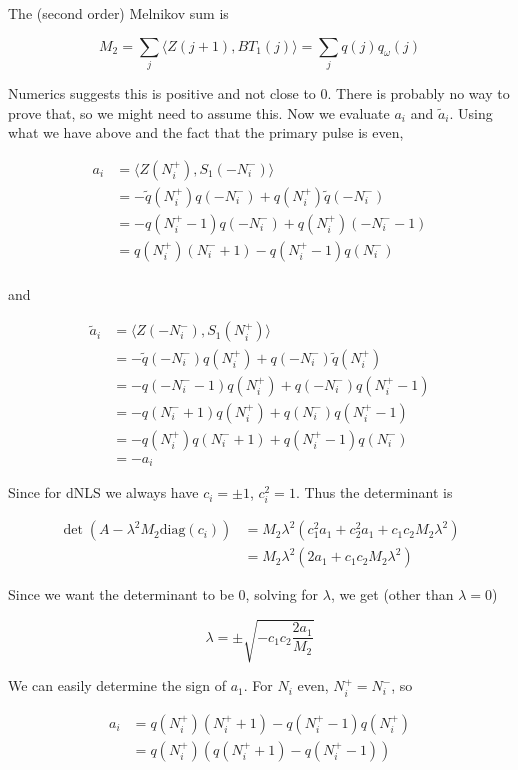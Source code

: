 \documentclass[12pt]{article}
\begin{document}
The (second order) Melnikov sum is

\[
M_2 = \sum_j \langle Z(j+1), B T_1(j) \rangle = \sum_j q(j) q_\omega(j)
\]

Numerics suggests this is positive and not close to 0. There is probably no way to prove that, so we might need to assume this. Now we evaluate $a_i$ and $\tilde{a}_i$. Using what we have above and the fact that the primary pulse is even,

\begin{align*}
a_i &= \langle Z(N_i^+), S_1(-N_i^-) \rangle \\
&= -\tilde{q}(N_i^+)q(-N_i^-) + q(N_i^+)\tilde{q}(-N_i^-) \\
&= -q(N_i^+ - 1)q(-N_i^-) + q(N_i^+)(-N_i^- - 1) \\
&= q(N_i^+)(N_i^- + 1) - q(N_i^+ - 1)q(N_i^-)\\
\end{align*}

and

\begin{align*}
\tilde{a}_i &= \langle Z(-N_i^-), S_1(N_i^+) \rangle \\
&= -\tilde{q}(-N_i^-)q(N_i^+) + q(-N_i^-)\tilde{q}(N_i^+) \\
&= -q(-N_i^- - 1)q(N_i^+) + q(-N_i^-)q(N_i^+ - 1) \\
&= -q(N_i^- + 1)q(N_i^+) + q(N_i^-)q(N_i^+ - 1) \\
&= -q(N_i^+)q(N_i^- + 1) + q(N_i^+ - 1)q(N_i^-) \\
&= -a_i
\end{align*}

Since for dNLS we always have $c_i = \pm 1$, $c_i^2 = 1$. Thus the determinant is

\begin{align*}
\det( A - \lambda^2 M_2 \text{diag}(c_i)) &= 
M_2 \lambda^2 ( c_1^2 a_1 + c_2^2 a_1 + c_1 c_2 M_2 \lambda^2 ) \\
&= M_2 \lambda^2 ( 2 a_1 + c_1 c_2 M_2 \lambda^2 )
\end{align*}

Since we want the determinant to be 0, solving for $\lambda$, we get (other than $\lambda = 0$)

\[
\lambda = \pm \sqrt{ -c_1 c_2 \frac{2 a_1}{M_2}}
\]

We can easily determine the sign of $a_1$. For $N_i$ even, $N_i^+ = N_i^-$, so

\begin{align*}
a_i &= q(N_i^+)(N_i^+ + 1) - q(N_i^+ - 1)q(N_i^+)\\
&= q(N_i^+)( q(N_i^+ + 1) - q(N_i^+ - 1))
\end{align*} 
\end{document}
